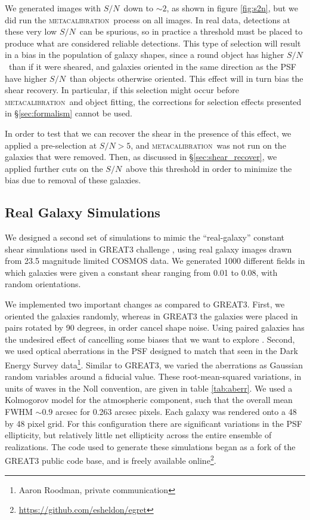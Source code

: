 \documentclass[iop]{emulateapj}
\newcommand{\snr}{$S/N$}
\newcommand{\mcal}{\textsc{metacalibration}}
\begin{document}
We generated images with \snr\ down to $\sim 2$, as shown in figure
\ref{fig:s2n}, but we did run the \mcal\ process on all images.  In real data,
detections at these very low \snr\ can be spurious, so in practice a threshold
must be placed to produce what are considered reliable detections.  This type
of selection will result in a bias in the population of galaxy shapes, since a
round object has higher \snr\ than if it were sheared, and galaxies oriented in
the same direction as the PSF have higher \snr\ than objects otherwise
oriented.  This effect will in turn bias the shear recovery.  In particular, if
this selection might occur before \mcal\ and object fitting, the corrections
for selection effects presented in \S \ref{sec:formalism} cannot be used.

In order to test that we can recover the shear in the presence of this effect,
we applied a pre-selection at \snr$ > 5$, and \mcal\ was not run on the
galaxies that were removed.  Then, as discussed in \S \ref{sec:shear_recover},
we applied further cuts on the \snr\ above this threshold in order to minimize
the bias due to removal of these galaxies.


\subsection{Real Galaxy Simulations} \label{sec:cosmosim}

We designed a second set of simulations to mimic the ``real-galaxy'' constant
shear simulations used in GREAT3 challenge \citep{great3}, using real galaxy
images drawn from 23.5 magnitude limited COSMOS data.  We generated 1000
different fields in which galaxies were given a constant shear ranging from
0.01 to 0.08, with random orientations.

We implemented two important changes as compared to GREAT3.  First, we oriented
the galaxies randomly, whereas in GREAT3 the galaxies were placed in pairs
rotated by 90 degrees, in order cancel shape noise.  Using paired galaxies has
the undesired effect of cancelling some biases that we want to explore
\citep{DESSVShear}.  Second, we used optical aberrations in the PSF designed to
match that seen in the Dark Energy Survey data\footnote{Aaron Roodman, private
communication}.  Similar to GREAT3, we varied the aberrations as Gaussian
random variables around a fiducial value. These root-mean-squared variations,
in units of waves in the Noll convention, are given in table \ref{tab:aberr}.
We used a Kolmogorov model for the atmospheric component, such that
the overall mean FWHM $\sim 0.9$ arcsec for 0.263 arcsec pixels.
Each galaxy was rendered onto a 48 by 48 pixel grid.
For this configuration there are
significant variations in the PSF ellipticity, but relatively little net
ellipticity across the entire ensemble of realizations.  The code used to
generate these simulations began as a fork of the GREAT3 public code base, and
is freely available online\footnote{\url{https://github.com/esheldon/egret}}.
\end{document}
